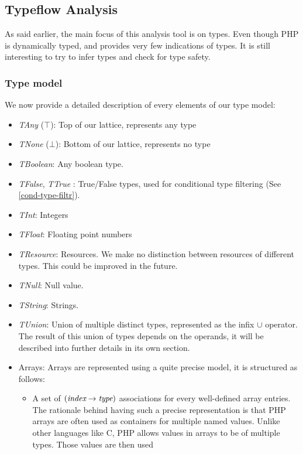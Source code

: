 \documentclass[a4paper]{article}
\begin{document}
\subsection{Typeflow Analysis}
As said earlier, the main focus of this analysis tool is on types. Even though
PHP is dynamically typed, and provides very few indications of types. It is
still interesting to try to infer types and check for type safety.

\subsubsection{Type model}
We now provide a detailed description of every elements of our type model:
\begin{itemize}
  \item \emph{TAny} ($\top$): Top of our lattice, represents any type
  \item \emph{TNone} ($\bot$): Bottom of our lattice, represents no type
  \item \emph{TBoolean}: Any boolean type.
  \item \emph{TFalse}, \emph{TTrue} : True/False types, used for conditional
    type filtering (See \ref{cond-type-filtr}).
  \item \emph{TInt}: Integers
  \item \emph{TFloat}: Floating point numbers
  \item \emph{TResource}: Resources. We make no distinction between resources
    of different types. This could be improved in the future.
  \item \emph{TNull}: Null value.
  \item \emph{TString}: Strings.
  \item \emph{TUnion}: Union of multiple distinct types, represented as the
    infix $\cup$ operator. The result of this union of types depends on the operands,
    it will be described into further details in its own section.
  \item Arrays: Arrays are represented using a quite precise model, it is
    structured as follows:
    \begin{itemize}
      \item A set of $(\emph{index} \rightarrow \emph{type})$ associations for
          every well-defined array entries. The rationale behind having such a precise
          representation is that PHP arrays are often used as containers for
          multiple named values. Unlike other languages like C, PHP allows values
          in arrays to be of multiple types. Those values are then used

\end{itemize}
\end{itemize}
\end{document}
